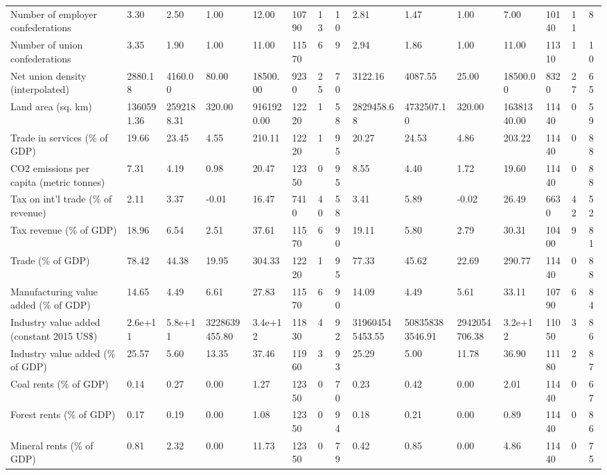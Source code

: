 \begin{longtable}{lllllllllllllll}
\addlinespace
Number of employer confederations & 3.30 & 2.50 & 1.00 & 12.00 & 10790 & 13 & 10 & 2.81 & 1.47 & 1.00 & 7.00 & 10140 & 11 & 8\\
Number of union confederations & 3.35 & 1.90 & 1.00 & 11.00 & 11570 & 6 & 9 & 2.94 & 1.86 & 1.00 & 11.00 & 11310 & 1 & 10\\
Net union density (interpolated) & 2880.18 & 4160.00 & 80.00 & 18500.00 & 9230 & 25 & 70 & 3122.16 & 4087.55 & 25.00 & 18500.00 & 8320 & 27 & 65\\
Land area (sq. km) & 1360591.36 & 2592188.31 & 320.00 & 9161920.00 & 12220 & 1 & 58 & 2829458.68 & 4732507.10 & 320.00 & 16381340.00 & 11440 & 0 & 59\\
Trade in services (\% of GDP) & 19.66 & 23.45 & 4.55 & 210.11 & 12220 & 1 & 95 & 20.27 & 24.53 & 4.86 & 203.22 & 11440 & 0 & 88\\
\addlinespace
CO2 emissions per capita (metric tonnes) & 7.31 & 4.19 & 0.98 & 20.47 & 12350 & 0 & 95 & 8.55 & 4.40 & 1.72 & 19.60 & 11440 & 0 & 88\\
Tax on int'l trade (\% of revenue) & 2.11 & 3.37 & -0.01 & 16.47 & 7410 & 40 & 58 & 3.41 & 5.89 & -0.02 & 26.49 & 6630 & 42 & 52\\
Tax revenue (\% of GDP) & 18.96 & 6.54 & 2.51 & 37.61 & 11570 & 6 & 90 & 19.11 & 5.80 & 2.79 & 30.31 & 10400 & 9 & 81\\
Trade (\% of GDP) & 78.42 & 44.38 & 19.95 & 304.33 & 12220 & 1 & 95 & 77.33 & 45.62 & 22.69 & 290.77 & 11440 & 0 & 88\\
Manufacturing value added (\% of GDP) & 14.65 & 4.49 & 6.61 & 27.83 & 11570 & 6 & 90 & 14.09 & 4.49 & 5.61 & 33.11 & 10790 & 6 & 84\\
\addlinespace
Industry value added (constant 2015 US\$) & 2.6e+11 & 5.8e+11 & 3228639455.80 & 3.4e+12 & 11830 & 4 & 92 & 319604545453.55 & 508358383546.91 & 2942054706.38 & 3.2e+12 & 11050 & 3 & 86\\
Industry value added (\% of GDP) & 25.57 & 5.60 & 13.35 & 37.46 & 11960 & 3 & 93 & 25.29 & 5.00 & 11.78 & 36.90 & 11180 & 2 & 87\\
Coal rents (\% of GDP) & 0.14 & 0.27 & 0.00 & 1.27 & 12350 & 0 & 70 & 0.23 & 0.42 & 0.00 & 2.01 & 11440 & 0 & 67\\
Forest rents (\% of GDP) & 0.17 & 0.19 & 0.00 & 1.08 & 12350 & 0 & 94 & 0.18 & 0.21 & 0.00 & 0.89 & 11440 & 0 & 86\\
Mineral rents (\% of GDP) & 0.81 & 2.32 & 0.00 & 11.73 & 12350 & 0 & 79 & 0.42 & 0.85 & 0.00 & 4.86 & 11440 & 0 & 75\\

\end{longtable}
